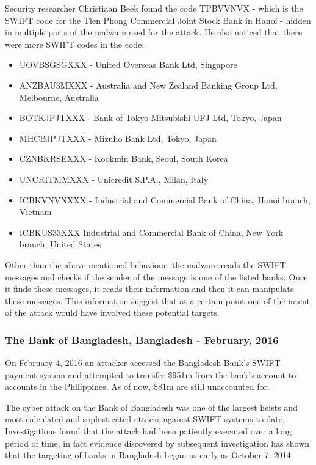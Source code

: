 \documentclass[12pt]{article}
\begin{document}
        Security researcher Christiaan Beek found the code TPBVVNVX - which is the SWIFT code for the Tien Phong Commercial Joint Stock Bank in Hanoi - hidden in multiple parts of the malware used for the attack.
        He also noticed that there were more SWIFT codes in the code:
        \begin{itemize}
            \item UOVBSGSGXXX - United Overseas Bank Ltd, Singapore
            \item ANZBAU3MXXX - Australia and New Zealand Banking Group Ltd, Melbourne, Australia
            \item BOTKJPJTXXX - Bank of Tokyo-Mitsubishi UFJ Ltd, Tokyo, Japan
            \item MHCBJPJTXXX - Mizuho Bank Ltd, Tokyo, Japan
            \item CZNBKRSEXXX - Kookmin Bank, Seoul, South Korea
            \item UNCRITMMXXX - Unicredit S.P.A., Milan, Italy
            \item ICBKVNVNXXX - Industrial and Commercial Bank of China, Hanoi branch, Vietnam
            \item ICBKUS33XXX Industrial and Commercial Bank of China, New York branch, United States
        \end{itemize}
       
        Other than the above-mentioned behaviour, the malware reads the SWIFT messages and checks if the sender of the message is one of the listed banks. Once it finds these messages, it reads their information and then it can manipulate these messages. This information suggest that at a certain point one of the intent of the attack would have involved these potential targets.\cite{AttacksSWIFTBanking2016}
        
    \subsubsection{The Bank of Bangladesh, Bangladesh - February, 2016}
        On February 4, 2016 an attacker accessed the Bangladesh Bank’s SWIFT payment system and attempted to transfer \$951m from the bank’s account to accounts in the Philippines. As of now, \$81m are still unaccounted for.

        The cyber attack on the Bank of Bangladesh was one of the largest heists and most calculated and sophisticated attacks against SWIFT systems to date. Investigations found that the attack had been patiently executed over a long period of time, in fact evidence discovered by subsequent investigation has shown that the targeting of banks in Bangladesh began as early as October 7, 2014.
        
\end{document}
